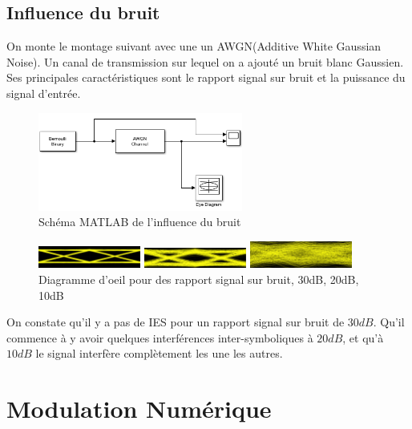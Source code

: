 \documentclass[11pt, openright]{book}
\begin{document}
\newpage


\subsection{Influence du bruit}

On monte le montage suivant avec une un AWGN(Additive White Gaussian Noise).  Un canal de transmission sur lequel on a ajouté un bruit blanc Gaussien. Ses principales caractéristiques sont le rapport signal sur bruit et la puissance du signal d’entrée.

\begin{figure}[ht!]
	\centering
	\includegraphics[width=0.6\textwidth]{./object/g9.png}
	\caption{Schéma MATLAB de l'influence du bruit}
\end{figure}
\begin{figure}[ht!]
	\includegraphics[width=0.3\textwidth]{./object/g6.png}

	\includegraphics[width=0.3\textwidth]{./object/g7.png}

	\includegraphics[width=0.3\textwidth]{./object/g8.png}
	\caption{Diagramme d'oeil pour des rapport signal sur bruit, 30dB, 20dB, 10dB}
\end{figure}

On constate qu'il y a pas de IES pour un rapport signal sur bruit de $30dB$. Qu'il commence à y avoir quelques interférences inter-symboliques à $20dB$, et qu'à $10dB$ le signal interfère complètement les une les autres.

\section{Modulation Numérique}
\end{document}

